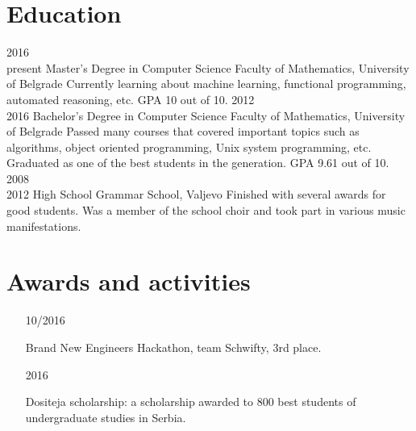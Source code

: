 \documentclass{my_cv}
\begin{document}
\section{Education}
\begin{entrylist}
  \entry
    {2016~\textemdash \\present}
    {Master's Degree in Computer Science}
    {Faculty of Mathematics, University of Belgrade}
    {Currently learning about machine learning, functional programming, automated reasoning, etc. GPA 10 out of 10.}
  \entry
    {2012~\textemdash \\2016}
    {Bachelor's Degree in Computer Science}
    {Faculty of Mathematics, University of Belgrade}
    {Passed many courses that covered important topics such as algorithms, object oriented programming, Unix system programming, etc. Graduated as one of the best students in the generation. GPA 9.61 out of 10.}
  \entry
    {2008~\textemdash \\2012}
    {High School}
    {Grammar School, Valjevo}
    {Finished with several awards for good students. Was a member of the school choir and took part in various music manifestations.}
\end{entrylist}

\section{Awards and activities}

\bodyfont
\begin{itemize}
  \item[\parbox{2cm}{10/2016}]\parbox{12.8cm}{ Brand New Engineers Hackathon, team Schwifty, 3rd place. }
   \item[\parbox{2cm}{2016}] Dositeja scholarship: a scholarship awarded to 800 best students of undergraduate studies in Serbia.
\end{itemize}
\end{document}
